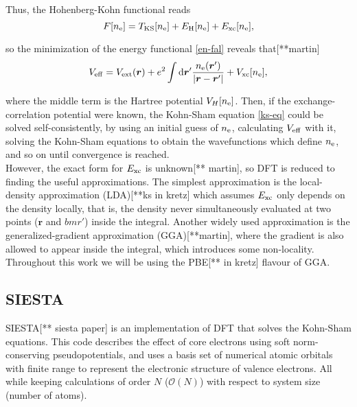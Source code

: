Thus, the Hohenberg-Kohn functional reads
\begin{equation}
F[n_{\mathrm{e}}]=T_{\mathrm{KS}}[n_{\mathrm{e}}]+E_{\mathrm{H}}[n_{\mathrm{e}}]+E_{\mathrm{xc}}[n_{\mathrm{e}}],
\end{equation}

so the minimization of the energy functional \ref{en-fal} reveals that[**martin]
\begin{equation}
\label{veff}
V_{\mathrm{eff}}=V_{\mathrm{ext}}(\bm r)+e^2\int\mathrm{d}\bm r'\frac{n_{\mathrm{e}}(\bm r')}{\abs{\bm r-\bm r'}}+V_{\mathrm{xc}}[n_{\mathrm{e}}],
\end{equation}

where the middle term is the Hartree potential \(V_{H}[n_{\mathrm{e}}]\). Then, if the exchange-correlation potential were known, the Kohn-Sham equation \ref{ks-eq} could be solved self-consistently, by using an initial guess of \(n_{\mathrm{e}}\), calculating \(V_{\mathrm{eff}}\) with it, solving the Kohn-Sham equations to obtain the wavefunctions which define \(n_{\mathrm{e}}\), and so on until convergence is reached.\\

However, the exact form for \(E_{\mathrm{xc}}\) is unknown[** martin], so DFT is reduced to finding the useful approximations. The simplest approximation is the local-density approximation (LDA)[**ks in kretz] which assumes \(E_{\mathrm{xc}}\) only depends on the density locally, that is, the density never simultaneously evaluated at two points (\(\bm r\) and \(bm r'\)) inside the integral. Another widely used approximation is the generalized-gradient approximation (GGA)[**martin], where the gradient is also allowed to appear inside the integral, which introduces some non-locality. Throughout this work we will be using the PBE[** in kretz] flavour of GGA.


\subsection{SIESTA}
SIESTA[** siesta paper] is an implementation of DFT that solves the Kohn-Sham equations. This code describes the effect of core electrons using soft norm-conserving pseudopotentials, and uses a basis set of numerical atomic orbitals with finite range to represent the electronic structure of valence electrons. All while keeping calculations of order \(N\) (\(\mathcal O(N)\)) with respect to system size (number of atoms).


